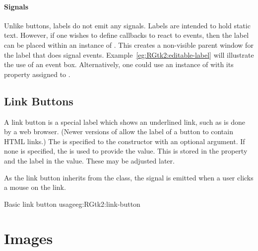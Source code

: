 \paragraph{Signals}
Unlike buttons, labels do not emit any signals. Labels are intended to
hold static text. However, if one wishes to define callbacks to react
to events, then the label can be placed within an instance of
. This creates a non-visible parent window
for the label that does signal
events. Example~\ref{eg:RGtk2:editable-label} will illustrate the use
of an event box.  Alternatively, one could use an instance of
 with its  property assigned to
.


\subsection{Link Buttons}
\label{sec:link-buttons}

A link button is a special label which shows an underlined link, such
as is done by a web browser. (Newer versions of \GTK\/ allow the label
of a button to contain HTML links.) The  is specified to the
 constructor with an optional
 argument. If none is specified, the
 is used to provide the value. This  is stored in
the  property and the label in the  value. These
may be adjusted later.

As the link button inherits from the  class, the
 signal is emitted when a user clicks a mouse on the link.

\begin{example}{Basic link button usage}{eg:RGtk2:link-button}
\begin{Schunk}
\end{Schunk}
\end{example}


\section{Images}
\label{sec:RGtk2:images}

